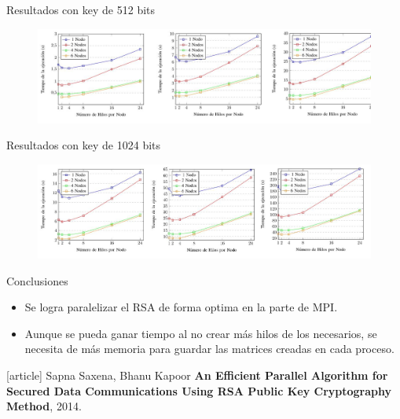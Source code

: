 \documentclass{beamer}
\begin{document}
\begin{frame}{Resultados con key de 512 bits}
 \begin{figure}
  \centering
  \includegraphics[scale = 0.28]{5.jpeg}
 \end{figure}
\end{frame}

\begin{frame}{Resultados con key de 1024 bits}
 \begin{figure}
  \centering
  \includegraphics[scale = 0.28]{6.jpeg}
 \end{figure}
\end{frame}


\begin{frame}{Conclusiones}
 \begin{itemize}
  \item Se logra paralelizar el RSA de forma optima en la parte de MPI.
  \item Aunque se pueda ganar tiempo al no crear más hilos de los necesarios, se necesita de más memoria para guardar las matrices creadas en cada proceso.
 \end{itemize}
\end{frame}



\begin{frame}
\begin{thebibliography}{}
[article]
 Sapna Saxena, Bhanu Kapoor \textbf{An Efficient Parallel Algorithm for Secured Data Communications Using RSA Public Key Cryptography Method}, 2014.
\end{thebibliography}
\end{frame}
\end{document}

